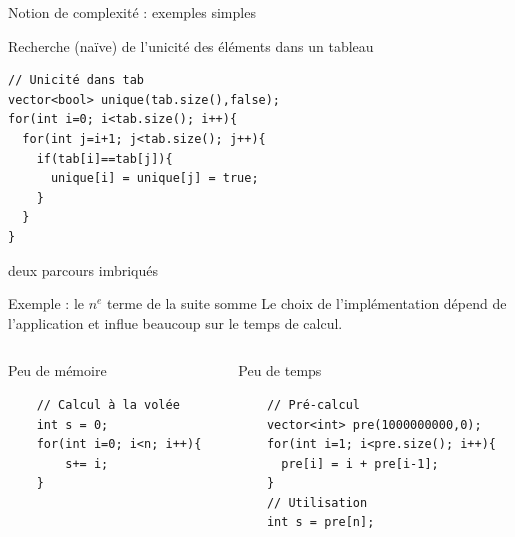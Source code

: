 \begin{frame}[fragile]{Notion de complexité : exemples simples}
\begin{exampleblock}{Recherche (naïve) de l'unicité des éléments dans un tableau}
\begin{verbatim}
// Unicité dans tab
vector<bool> unique(tab.size(),false);
for(int i=0; i<tab.size(); i++){
  for(int j=i+1; j<tab.size(); j++){
    if(tab[i]==tab[j]){
      unique[i] = unique[j] = true;
    }
  }
}
\end{verbatim}
deux parcours imbriqués 
\end{exampleblock}
\end{frame}

\begin{frame}[fragile]{Exemple : le $n^e$ terme de la suite somme}
Le choix de l'implémentation dépend de l'application et influe beaucoup sur le temps de calcul.
\begin{columns}
    \begin{column}{0.5\textwidth}
    \begin{block}{Peu de mémoire}
    \begin{verbatim}
    // Calcul à la volée
    int s = 0;
    for(int i=0; i<n; i++){
        s+= i;
    }
    \end{verbatim}
    \end{block}
    \end{column}
    \begin{column}{0.5\textwidth}
    \begin{block}{Peu de temps}
    \begin{verbatim}
    // Pré-calcul
    vector<int> pre(1000000000,0);
    for(int i=1; i<pre.size(); i++){
      pre[i] = i + pre[i-1];
    }
    // Utilisation
    int s = pre[n];
    \end{verbatim}
    \end{block}
    \end{column}
\end{columns}
\end{frame}



